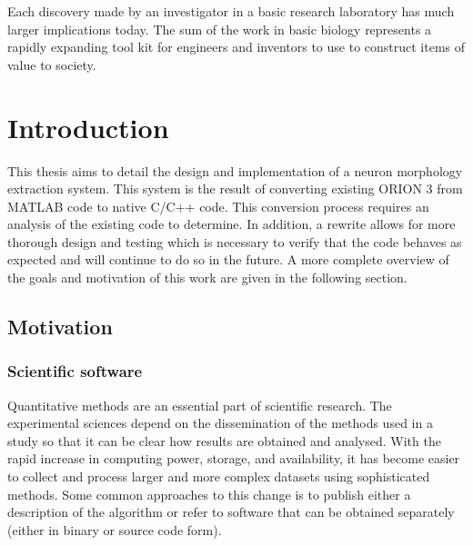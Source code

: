 \begin{savequote}[0.55\linewidth]
	\begin{fancyquote}
		Each discovery made by an investigator in a basic research
		laboratory has much larger implications today. The sum of the work in basic
		biology represents a rapidly expanding tool kit for engineers and inventors to
		use to construct items of value to society.
	\end{fancyquote}
\end{savequote}
\chapter{Introduction}\label{ch:introduction}


This thesis aims to detail the design and implementation of a
neuron morphology extraction system. This system is the result of
converting existing ORION 3\cite{ORION_Santamaria-Pang2015} from
MATLAB\cite{MATLAB:2013a} code to native C/C++ code.
This conversion process requires an analysis of the existing code
to determine. In addition, a rewrite allows for more thorough
design and testing which is necessary to verify that the code
behaves as expected and will continue to do so in the future. A
more complete overview of the goals and motivation of this work
are given in the following section.

\section{Motivation}


\subsection{Scientific software}
{ %
	Quantitative methods are an essential part of scientific research. The
	experimental sciences depend on the dissemination of the methods used in a
	study so that it can be clear how results are obtained and analysed. With the
	rapid increase in computing power, storage, and availability, it has become
	easier to collect and process larger and more complex datasets using
	sophisticated methods. Some common approaches to this change is to publish either a
	description of the algorithm or refer to software that can be obtained separately
	(either in binary or source code form).
}

